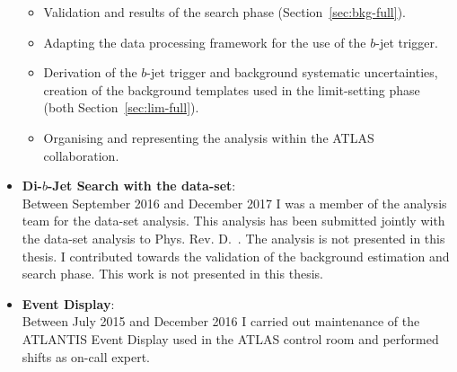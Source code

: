 \begin{itemize}[leftmargin=*]
\begin{itemize}
    \item Validation and results of the search phase (Section~\ref{sec:bkg-full}).
    \item Adapting the data processing framework for the use of the $b$-jet trigger.
    \item Derivation of the $b$-jet trigger and background systematic uncertainties,
      creation of the background templates used in the limit-setting phase (both Section~\ref{sec:lim-full}).
    \item Organising and representing the analysis within the ATLAS collaboration.
  \end{itemize}
  \vspace{1em}
\item\textbf{Di-$b$-Jet Search  with the \hm{} data-set}: \\
  Between September 2016 and December 2017 I was a member of the analysis team for the \hm{} data-set analysis.
  This analysis has been submitted jointly with the \lm{} data-set analysis to Phys. Rev. D.~\cite{dibjet-full}.
  The analysis is not presented in this thesis.
  I contributed towards the validation of the background estimation and search phase.
  This work is not presented in this thesis.\vspace{1em}
\item\textbf{Event Display}: \\
  Between July 2015 and December 2016 I carried out maintenance of the {\sc ATLANTIS} Event Display used in the ATLAS control room
  and performed shifts as on-call expert.
\end{itemize}
